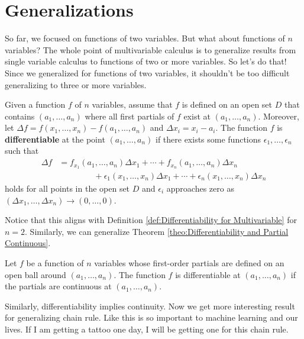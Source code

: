 \documentclass[../../../main.tex]{subfiles}
\begin{document}
\section{Generalizations}

So far, we focused on functions of two variables. But what about
functions of $n$ variables? The whole point of multivariable calculus
is to generalize results from single variable calculus to functions
of two or more variables. So let's do that! Since we generalized
for functions of two variables, it shouldn't be too difficult
generalizing to three or more variables.

\begin{definition}{}{}
Given a function $f$ of $n$ variables, assume that $f$ is defined
on an open set $D$ that contains $(a_1, \ldots, a_n)$ where all first
partials of $f$ exist at $(a_1, \ldots, a_n)$. Moreover,
let $\Delta f = f(x_1, \ldots, x_n) - f(a_1, \ldots, a_n)$ and
$\Delta x_i = x_i - a_i$. The function $f$ is \textbf{differentiable}
at the point $(a_1, \ldots, a_n)$ if there exists some functions
$\epsilon_1, \ldots, \epsilon_n$ such that
\begin{align*}
    \Delta f
    &= f_{x_1}(a_1, \ldots, a_n) \Delta x_1 + \cdots
        + f_{x_n}(a_1, \ldots, a_n) \Delta x_n \\
    &\qquad\qquad\ + \epsilon_1(x_1, \ldots, x_n) \Delta x_1
        + \cdots + \epsilon_n(x_1, \ldots, x_n) \Delta x_n
\end{align*}
holds for all points in the open set $D$ and $\epsilon_i$ approaches
zero as $(\Delta x_1, \ldots, \Delta x_n) \to (0, \ldots, 0)$.
\end{definition}

Notice that this aligns with Definition \ref{def:Differentiability
for Multivariable} for $n = 2$. Similarly, we can generalize
Theorem \ref{theo:Differentiability and Partial Continuous}.

\begin{theorem}{}{}
Let $f$ be a function of $n$ variables whose first-order partials
are defined on an open ball around $(a_1, \ldots, a_n)$. The function
$f$ is differentiable at $(a_1, \ldots, a_n)$ if the partials are
continuous at $(a_1, \ldots, a_n)$.
\end{theorem}

Similarly, differentiability implies continuity. Now we get more
interesting result for generalizing chain rule. Like this is so
important to machine learning and our lives. If I am getting a
tattoo one day, I will be getting one for this chain rule.
\end{document}
